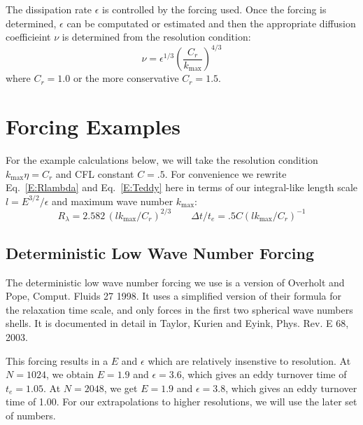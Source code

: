 \documentclass[12pt]{article}
\begin{document}
The dissipation rate $\epsilon$ is controlled by the forcing used.
Once the forcing is determined, $\epsilon$ can be computated or
estimated and then the appropriate diffusion coefficieint $\nu$ is
determined from the resolution condition:
\[
 \nu = \epsilon^{1/3} \left( \frac{C_r}{k_\text{max}} \right)^{4/3}
\]
where $C_r=1.0$ or the more conservative $C_r=1.5$. 


\section{Forcing Examples}

For the example calculations below, we will take the resolution condition
$ k_\text{max} \eta = C_r $ and CFL constant $C=.5$.  
For convenience we rewrite Eq.~\ref{E:Rlambda} and Eq.~\ref{E:Teddy} here 
in terms of our integral-like length scale $l=E^{3/2}/ \epsilon$ and
maximum wave number $k_\text{max}$:
\[
R_\lambda =   2.582 \,  (l k_\text{max}/C_r)^{2/3}
\qquad
\Delta t / t_e  =   .5 C   (l k_\text{max}/C_r)^{-1} 
\]


\subsection{Deterministic Low Wave Number Forcing}

The deterministic low wave number forcing we use is a version
of Overholt and Pope, Comput. Fluids 27 1998.  It uses a simplified
version of their formula for the relaxation time scale, and only forces
in the first two spherical wave numbers shells.
It is documented in detail in Taylor, Kurien and Eyink, Phys. Rev. E 68, 2003. 

This forcing results in a $E$ and $\epsilon$ which are relatively
insenstive to resolution.  At $N=1024$, we obtain 
$E=1.9$ and $\epsilon=3.6$, which gives
an eddy turnover time of $t_e = 1.05$.
At $N=2048$, we get $E=1.9$ and $\epsilon=3.8$, which gives
an eddy turnover time of 1.00.  For our extrapolations to higher resolutions, 
we will use the later set of numbers.  
\end{document}
